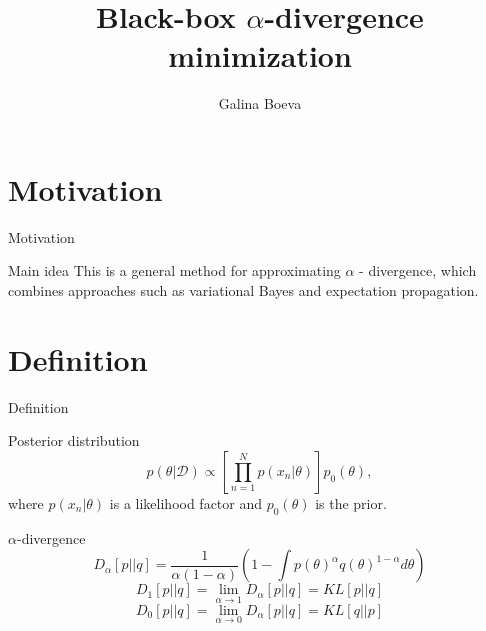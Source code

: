 \documentclass{beamer}
\title{Black-box $\alpha$-divergence minimization}
\author{Galina Boeva}
\institute{MIPT, 2023}
\begin{document}
\begin{frame}
    \titlepage
\end{frame}


\begin{frame}
    \tableofcontents
\end{frame}


\section{Motivation}
\begin{frame}{Motivation}
    \begin{block}{Main idea}
    This is a general method for approximating $\alpha$ - divergence, which combines approaches such as variational Bayes and expectation propagation.
    \end{block} 
\end{frame}

\section{Definition}
\begin{frame}{Definition}
    \begin{block}{Posterior distribution}
    \begin{equation}
        p(\theta | \mathcal{D}) \propto \left[\displaystyle\prod_{n=1}^N p(x_n|\theta)\right] p_0(\theta),
    \end{equation} 
        where $p(x_n|\theta)$ is a likelihood factor and $p_0(\theta)$ is the prior.
    \end{block}
    \begin{block}{$\alpha$-divergence}
    \begin{equation}
        D_{\alpha}[p||q] = \frac{1}{\alpha(1 − \alpha)}\left(1 - \int p(\theta)^{\alpha} q(\theta)^{1−\alpha}d\theta\right)
    \end{equation} 
    \[D_1[p||q] = \lim_{\alpha\to1} D_{\alpha}[p||q] = KL[p||q]\]
    \[D_0[p||q] = \lim_{\alpha\to0} D_{\alpha}[p||q] = KL[q||p]\] 
    \end{block}
\end{frame}
\end{document}
